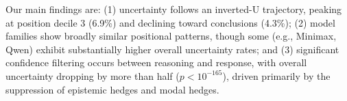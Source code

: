 Our main findings are: (1) uncertainty follows an inverted-U trajectory, peaking at position decile 3 (6.9\%) and declining toward conclusions (4.3\%); (2) model families show broadly similar positional patterns, though some (e.g., Minimax, Qwen) exhibit substantially higher overall uncertainty rates; and (3) significant confidence filtering occurs between reasoning and response, with overall uncertainty dropping by more than half ($p < 10^{-165}$), driven primarily by the suppression of epistemic hedges and modal hedges.
